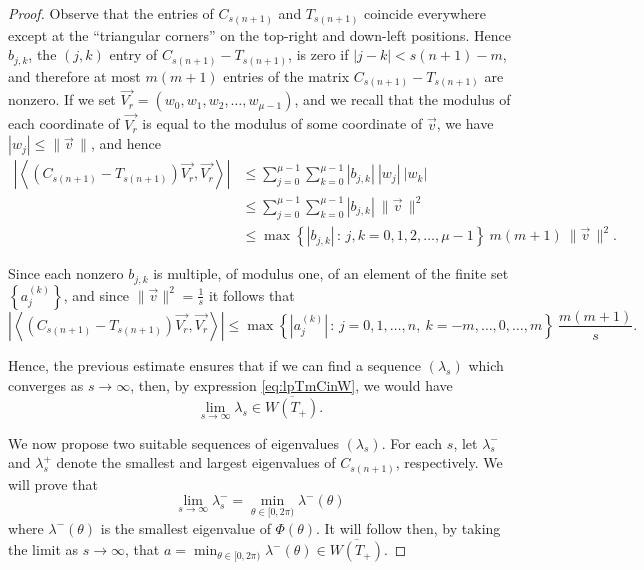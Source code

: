 \documentclass[12pt,reqno]{amsart}
\theoremstyle{definition}
\newcommand{\Vr}{\overrightarrow{V_r}}
\begin{document}
\begin{proof}
Observe that the entries of $C_{s(n+1)}$ and $T_{s(n+1)}$ coincide everywhere except at the ``triangular corners'' on the top-right and down-left positions. Hence $b_{j,k}$, the $(j,k)$ entry of $C_{s(n+1)}-T_{s(n+1)}$, is zero if $|j-k|<s(n+1)-m$, and therefore at most $m(m+1)$ entries of the matrix $C_{s(n+1)}-T_{s(n+1)}$ are nonzero. If we set $\Vr=(w_0, w_1, w_2, \dots, w_{\mu-1})$, and we recall that the modulus of each coordinate of $\Vr$ is equal to the modulus of some coordinate of $\vec{v}$,  we have $|w_j|\leq \| \vec{v} \, \|$, and hence
\begin{align*}
    \left| \left\langle \left(C_{s(n+1)}-T_{s(n+1)}\right) \Vr, \Vr \right\rangle  \right|
    &\leq
    \sum_{j=0}^{\mu-1}    \sum_{k=0}^{\mu-1} |b_{j,k}| \ |w_j| \ |w_k| \\
    & \leq 
    \sum_{j=0}^{\mu-1}    \sum_{k=0}^{\mu-1} |b_{j,k}| \ \| \vec{v} \,\|^2 \\
    & \leq \max\left\{|b_{j,k}| \, : \, j, k =0, 1, 2, \dots, \mu -1\right\} \ m(m+1) \ \| \vec{v} \,\|^2.
\end{align*}

Since each nonzero $b_{j,k}$ is multiple, of modulus one, of an element of the finite set $\left\{a_j^{(k)}\right\}$, and since $\| \vec{v}\|^2=\frac{1}{s}$ it follows that 
\[
    \left| \left\langle \left(C_{s(n+1)}-T_{s(n+1)}\right) \Vr, \Vr \right\rangle  \right|
    \leq \max\left\{\left|a_j^{(k)}\right| \, : \, j=0, 1, \dots, n, \ k=-m, \dots, 0, \dots, m \right\} \ \frac{m(m+1)}{s}.
\]

Hence, the previous estimate ensures that if we can find a sequence $(\lambda_s)$ which converges as $s \to \infty$, then, by expression \eqref{eq:lpTmCinW}, we would have
\begin{equation} \label{lim_in_W}
\lim_{s \to \infty}\lambda_{s} \in  \overline{W(T_+)}.
\end{equation}

We now propose two suitable sequences of eigenvalues $(\lambda_{s})$. For each $s$, let $\lambda_s^-$ and
 $\lambda_s^+$ denote the smallest and largest eigenvalues of $C_{s(n+1)}$, respectively. 
We will prove that 
\begin{equation}\label{lim=min}
     \lim_{s \to \infty}\lambda_s^-=\min_{\theta\in[0,2\pi)}\lambda^-(\theta)
\end{equation}
 where $\lambda^-(\theta)$ is the smallest eigenvalue of $\Phi(\theta)$. It will follow then, by taking the limit as
 $s \to \infty$, that $a=\min_{\theta\in[0,2\pi)}
\lambda^-(\theta)\in \overline{W(T_+)}$.


\end{proof}
\end{document}

